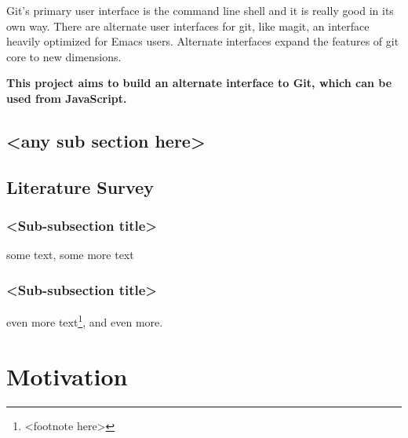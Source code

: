 Git's primary user interface is the command line shell and it is really good in
its own way. There are alternate user interfaces for git, like
magit\cite{magit}, an interface heavily optimized for Emacs\cite{emacs} users.
Alternate interfaces expand the features of git core to new dimensions.

\textbf{This project aims to build an alternate interface to Git, which can be
  used from JavaScript.}

\subsection{<any sub section here>}

\subsection{Literature Survey}

\subsubsection{<Sub-subsection title>}
some text\cite{citation-1-name-here}, some more text

\subsubsection{<Sub-subsection title>}
even more text\footnote{<footnote here>}, and even more.

\section{Motivation}
